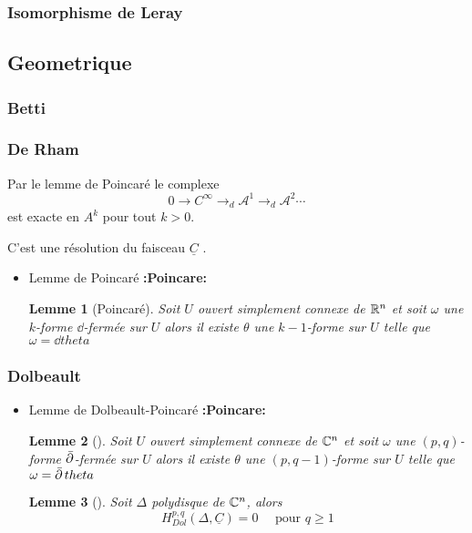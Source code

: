 \documentclass[12pt,makeidx]{amsart}
\newtheorem{lem}{Lemme}
\begin{document}
\subsubsection{Isomorphisme de Leray}
\label{sec-1-2-5}
\subsection{Geometrique}
\label{sec-1-3}
\subsubsection{Betti}
\label{sec-1-3-1}
\subsubsection{De Rham}
\label{sec-1-3-2}

Par le lemme de Poincaré le complexe
\begin{equation}\label{ExSeq_DR}
0 \rightarrow  C^\infty \rightarrow_d
\mathcal{A}^1 \rightarrow_d \mathcal{A}^2 \cdots
\end{equation}
 est exacte en $A^k$ pour tout $k>0$.

C'est une résolution du faisceau $\underline{C}$
\cite{Voisin}.
\begin{itemize}

\item Lemme de Poincaré \textbf{:Poincare:}
\label{sec-1-3-2-1}%
\begin{lem}[Poincaré\label{LemmePoincare}]
Soit $U$ ouvert simplement connexe de $\mathbb{R}^n$ et soit $\omega$ une $k$-forme $\dd$-fermée sur $U$ alors il existe $\theta$ une $k-1$-forme sur $U$ telle que $\omega = \dd theta$
\end{lem}


\end{itemize} %
\subsubsection{Dolbeault}
\label{sec-1-3-3}
\begin{itemize}

\item Lemme de Dolbeault-Poincaré \textbf{:Poincare:}
\label{sec-1-3-3-1}%
\begin{lem}[]
Soit $U$ ouvert simplement connexe de $\mathbb{C}^n$ et soit $\omega$ une $(p,q)$-forme $\operatorname{\bar{\partial}}$-fermée sur $U$ alors il existe $\theta$ une $(p,q-1)$-forme sur $U$ telle que $\omega = \operatorname{\bar{\partial}} theta$
\end{lem}

\begin{lem}[\cite{Griffiths-Harris}]
Soit $\Delta$ polydisque de $\mathbb{C}^n$, alors
\begin{equation}
H^{p,q}_{Dol}(\Delta,\underline{C}) = 0 \quad \text{ pour } q \geq 1
\end{equation}
\end{lem}
\end{itemize} %
\end{document}
